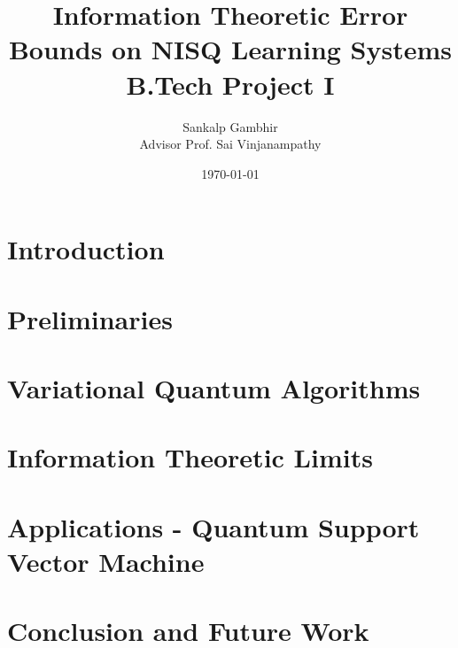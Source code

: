 \documentclass[
    paper=a4, 
    lang=en, 
    font=kpfonts,
    ptsize=12pt,
    titles=bf,
    hanging-titles=true,
    final
]
{skrapport}
\title{
    {\huge Information Theoretic Error Bounds on NISQ Learning Systems} \\
    {\large B.Tech Project I}
    }
\author[sgambhir@iitb.ac.in]{
    Sankalp Gambhir \\ 
    \vspace{1em}
        {
            \normalsize 
            \hspace{0.1em} 
            Advisor \hspace{0.5em}
            Prof. Sai Vinjanampathy
        }
    \vspace{-1.3em}
}
\date{\today}
\begin{document}
    \begin{titlepage}
        \maketitle
        \begin{abstract}
            \lipsum[1]
        \end{abstract}
    \end{titlepage}

    \tableofcontents \pagebreak

    \section{Introduction}
        \label{sec:intro}
        
    
    \section{Preliminaries}
        \label{sec:prelim}
        

    \section{Variational Quantum Algorithms}
        \label{sec:vqa}
        
    
    \section{Information Theoretic Limits}
        \label{sec:infolimits}
        

    \section{Applications - Quantum Support Vector Machine}
        \label{sec:qsvm}
        

    \section{Conclusion and Future Work}
        \label{sec:future}
        

    \printbibliography
\end{document}
